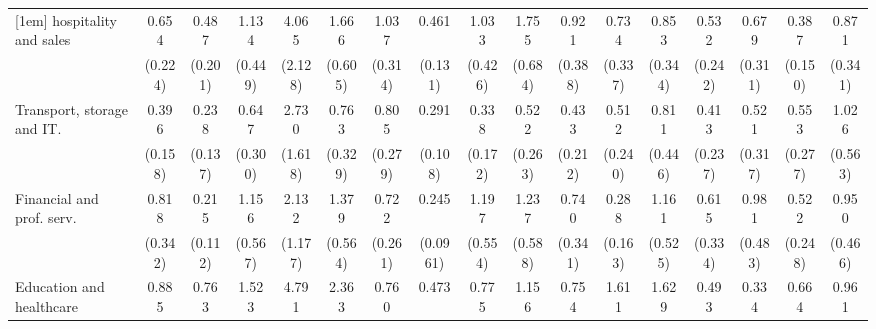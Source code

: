 {\begin{tabular}{l*{16}{c}}
[1em]
hospitality and sales&       0.654         &       0.487         &       1.134         &       4.065\sym{**} &       1.666         &       1.037         &       0.461\sym{**} &       1.033         &       1.755         &       0.921         &       0.734         &       0.853         &       0.532         &       0.679         &       0.387\sym{*}  &       0.871         \\
                    &     (0.224)         &     (0.201)         &     (0.449)         &     (2.128)         &     (0.605)         &     (0.314)         &     (0.131)         &     (0.426)         &     (0.684)         &     (0.388)         &     (0.337)         &     (0.344)         &     (0.242)         &     (0.311)         &     (0.150)         &     (0.341)         \\
[1em]
Transport, storage and IT.&       0.396\sym{*}  &       0.238\sym{*}  &       0.647         &       2.730         &       0.763         &       0.805         &       0.291\sym{***}&       0.338\sym{*}  &       0.522         &       0.433         &       0.512         &       0.811         &       0.413         &       0.521         &       0.553         &       1.026         \\
                    &     (0.158)         &     (0.137)         &     (0.300)         &     (1.618)         &     (0.329)         &     (0.279)         &     (0.108)         &     (0.172)         &     (0.263)         &     (0.212)         &     (0.240)         &     (0.446)         &     (0.237)         &     (0.317)         &     (0.277)         &     (0.563)         \\
[1em]
Financial and prof. serv.&       0.818         &       0.215\sym{**} &       1.156         &       2.132         &       1.379         &       0.722         &       0.245\sym{***}&       1.197         &       1.237         &       0.740         &       0.288\sym{*}  &       1.161         &       0.615         &       0.981         &       0.522         &       0.950         \\
                    &     (0.342)         &     (0.112)         &     (0.567)         &     (1.177)         &     (0.564)         &     (0.261)         &    (0.0961)         &     (0.554)         &     (0.588)         &     (0.341)         &     (0.163)         &     (0.525)         &     (0.334)         &     (0.483)         &     (0.248)         &     (0.466)         \\
[1em]
Education and healthcare&       0.885         &       0.763         &       1.523         &       4.791\sym{**} &       2.363\sym{*}  &       0.760         &       0.473         &       0.775         &       1.156         &       0.754         &       1.611         &       1.629         &       0.493         &       0.334\sym{*}  &       0.664         &       0.961         \\

\end{tabular}}
